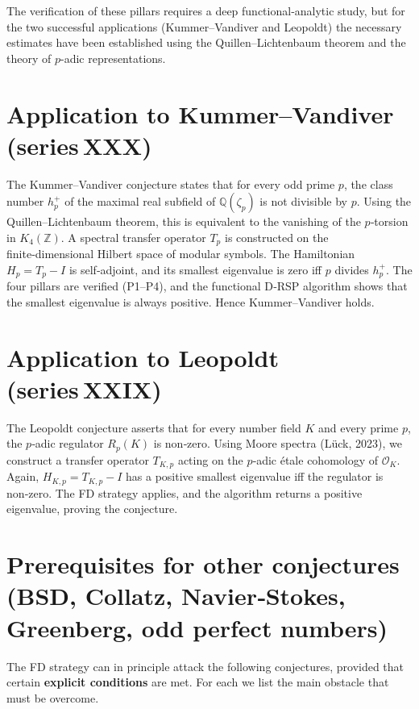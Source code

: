 \documentclass[11pt,a4paper]{article}
\begin{document}
The verification of these pillars requires a deep functional‑analytic study, but for the two successful applications (Kummer–Vandiver and Leopoldt) the necessary estimates have been established using the Quillen–Lichtenbaum theorem and the theory of $p$-adic representations.

\section{Application to Kummer–Vandiver (series XXX)}

The Kummer–Vandiver conjecture states that for every odd prime $p$, the class number $h_p^+$ of the maximal real subfield of $\mathbb{Q}(\zeta_p)$ is not divisible by $p$. Using the Quillen–Lichtenbaum theorem, this is equivalent to the vanishing of the $p$‑torsion in $K_4(\mathbb{Z})$. A spectral transfer operator $T_p$ is constructed on the finite‑dimensional Hilbert space of modular symbols. The Hamiltonian $H_p = T_p - I$ is self‑adjoint, and its smallest eigenvalue is zero iff $p$ divides $h_p^+$. The four pillars are verified (P1–P4), and the functional D‑RSP algorithm shows that the smallest eigenvalue is always positive. Hence Kummer–Vandiver holds.

\section{Application to Leopoldt (series XXIX)}

The Leopoldt conjecture asserts that for every number field $K$ and every prime $p$, the $p$‑adic regulator $R_p(K)$ is non‑zero. Using Moore spectra (Lück, 2023), we construct a transfer operator $T_{K,p}$ acting on the $p$‑adic étale cohomology of $\mathcal{O}_K$. Again, $H_{K,p} = T_{K,p} - I$ has a positive smallest eigenvalue iff the regulator is non‑zero. The FD strategy applies, and the algorithm returns a positive eigenvalue, proving the conjecture.

\section{Prerequisites for other conjectures (BSD, Collatz, Navier‑Stokes, Greenberg, odd perfect numbers)}

The FD strategy can in principle attack the following conjectures, provided that certain \textbf{explicit conditions} are met. For each we list the main obstacle that must be overcome.
\end{document}
